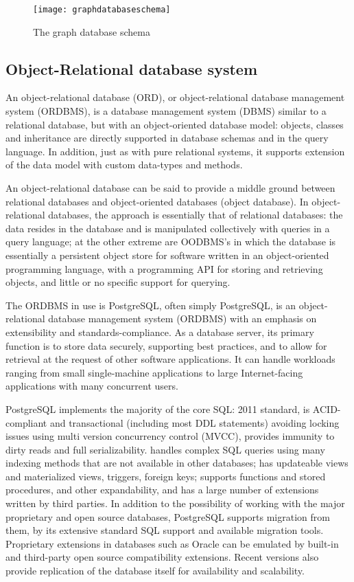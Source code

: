 \begin{figure}[h]
	\texttt{[image: graphdatabaseschema]}
	\centering
	\caption{The graph database schema}
	\label{fig:graphdatabaseschema}
\end{figure}

\subsection{Object-Relational database system}

\par An object-relational database (ORD), or object-relational database management system (ORDBMS), is a database management system (DBMS) similar to a relational database, but with an object-oriented database model: objects, classes and inheritance are directly supported in database schemas and in the query language. In addition, just as with pure relational systems, it supports extension of the data model with custom data-types and methods.
\par An object-relational database can be said to provide a middle ground between relational databases and object-oriented databases (object database). In object-relational databases, the approach is essentially that of relational databases: the data resides in the database and is manipulated collectively with queries in a query language; at the other extreme are OODBMS’s in which the database is essentially a persistent object store for software written in an object-oriented programming language, with a programming API for storing and retrieving objects, and little or no specific support for querying.
\par The ORDBMS in use is PostgreSQL, often simply PostgreSQL, is an object-relational database management system (ORDBMS) with an emphasis on extensibility and standards-compliance. As a database server, its primary function is to store data securely, supporting best practices, and to allow for retrieval at the request of other software applications. It can handle workloads ranging from small single-machine applications to large Internet-facing applications with many concurrent users.
\\
\par PostgreSQL implements the majority of the core SQL: 2011 standard, is ACID-compliant and transactional (including most DDL statements) avoiding locking issues using multi version concurrency control (MVCC), provides immunity to dirty reads and full serializability. handles complex SQL queries using many indexing methods that are not available in other databases; has updateable views and materialized views, triggers, foreign keys; supports functions and stored procedures, and other expandability, and has a large number of extensions written by third parties. In addition to the possibility of working with the major proprietary and open source databases, PostgreSQL supports migration from them, by its extensive standard SQL support and available migration tools. Proprietary extensions in databases such as Oracle can be emulated by built-in and third-party open source compatibility extensions. Recent versions also provide replication of the database itself for availability and scalability.
